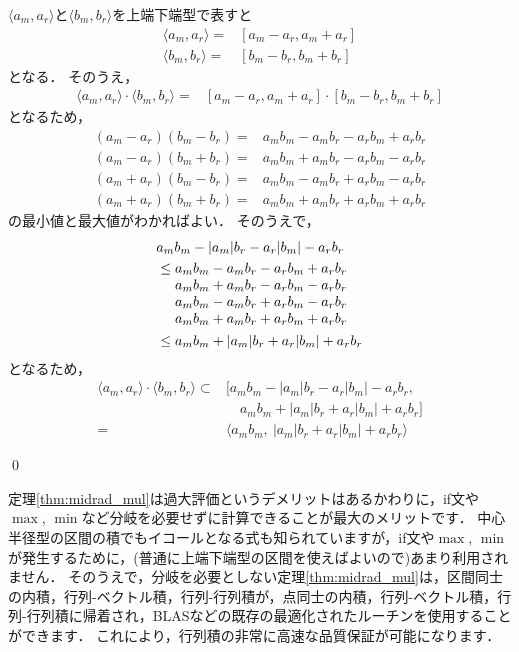 \begin{Proof}
	$\langle a_m, a_r \rangle$と$\langle b_m, b_r \rangle$を上端下端型で表すと
	\begin{align*}
		\langle a_m, a_r \rangle =& [ a_m - a_r, a_m + a_r ] \\
		\langle b_m, b_r \rangle =& [ b_m - b_r, b_m + b_r ]
	\end{align*}
	となる．
	そのうえ，
	\begin{align*}
		\langle a_m, a_r \rangle \cdot \langle b_m, b_r \rangle =& [ a_m - a_r, a_m + a_r ] \cdot [ b_m - b_r, b_m + b_r ]
	\end{align*}
	となるため，
	\begin{align*}
		(a_m - a_r) ( b_m - b_r ) =& a_m b_m - a_m b_r - a_r b_m + a_r b_r \\
		(a_m - a_r) ( b_m + b_r ) =& a_m b_m + a_m b_r - a_r b_m - a_r b_r \\
		(a_m + a_r) ( b_m - b_r ) =& a_m b_m - a_m b_r + a_r b_m - a_r b_r \\
		(a_m + a_r) ( b_m + b_r ) =& a_m b_m + a_m b_r + a_r b_m + a_r b_r
	\end{align*}
	の最小値と最大値がわかればよい．
	そのうえで，
	\begin{align*}
		&a_m b_m - | a_m | b_r - a_r | b_m | - a_r b_r \\
		&\le \begin{array}[t]{@{}c@{}}
			a_m b_m - a_m b_r - a_r b_m + a_r b_r \\
			a_m b_m + a_m b_r - a_r b_m - a_r b_r \\
			a_m b_m - a_m b_r + a_r b_m - a_r b_r \\
			a_m b_m + a_m b_r + a_r b_m + a_r b_r
		\end{array} \\
		&\le a_m b_m + | a_m | b_r + a_r | b_m | + a_r b_r
	\end{align*}
	となるため，
	\begin{align*}
		\langle a_m, a_r \rangle \cdot \langle b_m, b_r \rangle \subset& [ a_m b_m - | a_m | b_r - a_r | b_m | - a_r b_r, \\
		& \quad a_m b_m + | a_m | b_r + a_r | b_m | + a_r b_r ] \\
		=& \langle a_m b_m, ~ | a_m | b_r + a_r | b_m | + a_r b_r \rangle
	\end{align*}	

\qed
\end{Proof}

定理\ref{thm:midrad_mul}は過大評価というデメリットはあるかわりに，if文や$\max$, $\min$など分岐を必要せずに計算できることが最大のメリットです．
中心半径型の区間の積でもイコールとなる式も知られていますが，if文や$\max$, $\min$が発生するために，(普通に上端下端型の区間を使えばよいので)あまり利用されません．
そのうえで，分岐を必要としない定理\ref{thm:midrad_mul}は，区間同士の内積，行列-ベクトル積，行列-行列積が，点同士の内積，行列-ベクトル積，行列-行列積に帰着され，BLASなどの既存の最適化されたルーチンを使用することができます．
これにより，行列積の非常に高速な品質保証が可能になります．




